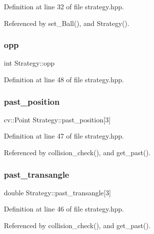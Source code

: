 Definition at line 32 of file strategy.\+hpp.



Referenced by set\+\_\+\+Ball(), and Strategy().

\mbox{\label{class_strategy_afca3fbf10bf6568a024a17ff588fe3f3}} 
\subsubsection{\texorpdfstring{opp}{opp}}
{\footnotesize\ttfamily int Strategy\+::opp}



Definition at line 48 of file strategy.\+hpp.

\mbox{\label{class_strategy_af25c3e91e0deb8592eae48c9bf8d2f18}} 
\subsubsection{\texorpdfstring{past\+\_\+position}{past\_position}}
{\footnotesize\ttfamily cv\+::\+Point Strategy\+::past\+\_\+position\mbox{[}3\mbox{]}}



Definition at line 47 of file strategy.\+hpp.



Referenced by collision\+\_\+check(), and get\+\_\+past().

\mbox{\label{class_strategy_a8f2c9428adf1de34e420106df1dc2f02}} 
\subsubsection{\texorpdfstring{past\+\_\+transangle}{past\_transangle}}
{\footnotesize\ttfamily double Strategy\+::past\+\_\+transangle\mbox{[}3\mbox{]}}



Definition at line 46 of file strategy.\+hpp.



Referenced by collision\+\_\+check(), and get\+\_\+past().

